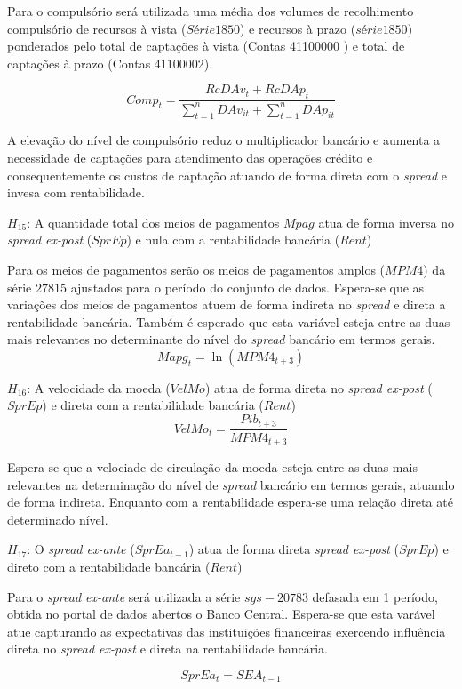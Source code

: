 \documentclass[12pt,12pt,openright,oneside,a4paper,chapter=TITLE,section=TITLE,subsection=TITLE,subsubsection=TITLE english,french,spanish,portugues,sumario=tradicional]{abntex2}
\begin{document}
Para o compulsório será utilizada uma média dos volumes de recolhimento compulsório de recursos à vista (\(Série 1850\)) e recursos à prazo (\(série 1850\)) ponderados pelo total de captações à vista (Contas 41100000 ) e total de captações à prazo (Contas 41100002).

\[
Comp_{t} = \frac{RcDAv_{t} + RcDAp_{t}}{\sum_{t=1}^{n}DAv_{it} + \sum_{t=1}^{n}DAp_{it}}
\]

A elevação do nível de compulsório reduz o multiplicador bancário e aumenta a necessidade de captações para atendimento das operações crédito e consequentemente os custos de captação atuando de forma direta com o \emph{spread} e invesa com rentabilidade.

\(H_15\): A quantidade total dos meios de pagamentos \(Mpag\) atua de forma inversa no \emph{spread ex-post} (\(SprEp\)) e nula com a rentabilidade bancária (\(Rent\))

Para os meios de pagamentos serão os meios de pagamentos amplos (\(MPM4\)) da série \(27815\) ajustados para o período do conjunto de dados. Espera-se que as variações dos meios de pagamentos atuem de forma indireta no \emph{spread} e direta a rentabilidade bancária. Também é esperado que esta variável esteja entre as duas mais relevantes no determinante do nível do \emph{spread} bancário em termos gerais.
\[
Mapg_{t} = \ln(MPM4_{t+3})
\]

\(H_16\): A velocidade da moeda (\(VelMo\)) atua de forma direta no \emph{spread ex-post} (\(SprEp\)) e direta com a rentabilidade bancária (\(Rent\))
\[
VelMo_{t} = \frac{Pib_{t+3}}{MPM4_{t+3}}
\]

Espera-se que a velociade de circulação da moeda esteja entre as duas mais relevantes na determinação do nível de \emph{spread} bancário em termos gerais, atuando de forma indireta. Enquanto com a rentabilidade espera-se uma relação direta até determinado nível.

\(H_17\): O \emph{spread ex-ante} (\(SprEa_{t-1}\)) atua de forma direta \emph{spread ex-post} (\(SprEp\)) e direto com a rentabilidade bancária (\(Rent\))

Para o \emph{spread ex-ante} será utilizada a série \(sgs-20783\) defasada em 1 período, obtida no portal de dados abertos o Banco Central. Espera-se que esta varável atue capturando as expectativas das instituições financeiras exercendo influência direta no \emph{spread ex-post} e direta na rentabilidade bancária.

\[
SprEa_{t} = SEA_{t-1}
\]
\end{document}
